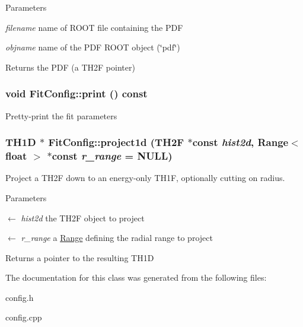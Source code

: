 \begin{DoxyParams}{Parameters}
\item[{\em filename}]name of ROOT file containing the PDF \item[{\em objname}]name of the PDF ROOT object (\char`\"{}pdf\char`\"{}) \end{DoxyParams}
\begin{DoxyReturn}{Returns}
the PDF (a TH2F pointer) 
\end{DoxyReturn}
\hypertarget{classFitConfig_af39057bb8cece4c40f7f70afa139bbba}{
\subsubsection[{print}]{\setlength{\rightskip}{0pt plus 5cm}void FitConfig::print () const}}
\label{classFitConfig_af39057bb8cece4c40f7f70afa139bbba}
Pretty-\/print the fit parameters \hypertarget{classFitConfig_ad79c573a375545a767dcfc1b8baea5e6}{
\subsubsection[{project1d}]{\setlength{\rightskip}{0pt plus 5cm}TH1D $\ast$ FitConfig::project1d (TH2F $\ast$const  {\em hist2d}, \/  {\bf Range}$<$ float $>$ $\ast$const  {\em r\_\-range} = {\ttfamily NULL})}}
\label{classFitConfig_ad79c573a375545a767dcfc1b8baea5e6}
Project a TH2F down to an energy-\/only TH1F, optionally cutting on radius.


\begin{DoxyParams}{Parameters}
\item[\mbox{$\leftarrow$} {\em hist2d}]the TH2F object to project \item[\mbox{$\leftarrow$} {\em r\_\-range}]a \hyperlink{structRange}{Range} defining the radial range to project \end{DoxyParams}
\begin{DoxyReturn}{Returns}
a pointer to the resulting TH1D 
\end{DoxyReturn}


The documentation for this class was generated from the following files:\begin{DoxyCompactItemize}
\item 
config.h\item 
config.cpp\end{DoxyCompactItemize}
